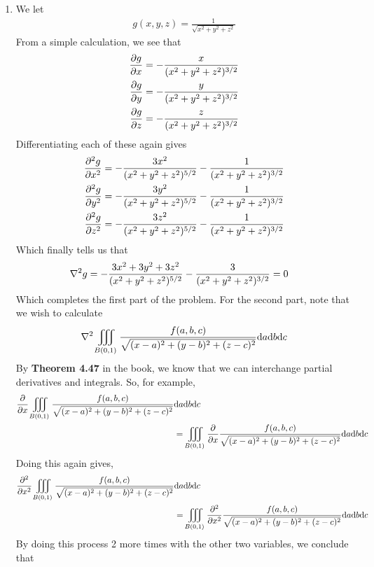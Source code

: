 \documentclass[12pt]{article}
\theoremstyle{definition}
\theoremstyle{remark}
\begin{document}
\begin{enumerate}[leftmargin=\labelsep]
		\item We let 
		\begin{align*}
			g(x,y,z)=\frac{1}{\sqrt{x^2+y^2+z^2}}
		\end{align*}
		From a simple calculation, we see that
		\begin{align*}
			\pdv{g}{x} = -\frac{x}{(x^2+y^2+z^2)^{3/2}} \\
			\pdv{g}{y} = -\frac{y}{(x^2+y^2+z^2)^{3/2}} \\
			\pdv{g}{z} = -\frac{z}{(x^2+y^2+z^2)^{3/2}}
		\end{align*}
		Differentiating each of these again gives
		\begin{align*}
			\pdv[2]{g}{x} = -\frac{3x^2}{(x^2+y^2+z^2)^{5/2}}-\frac1{(x^2+y^2+z^2)^{3/2}} \\
			\pdv[2]{g}{y} = -\frac{3y^2}{(x^2+y^2+z^2)^{5/2}}-\frac1{(x^2+y^2+z^2)^{3/2}} \\
			\pdv[2]{g}{z} = -\frac{3z^2}{(x^2+y^2+z^2)^{5/2}}-\frac1{(x^2+y^2+z^2)^{3/2}} \\
		\end{align*}
		Which finally tells us that
		\begin{align*}
			\laplacian{g}=-\frac{3x^2+3y^2+3z^2}{(x^2+y^2+z^2)^{5/2}}-\frac{3}{(x^2+y^2+z^2)^{3/2}} &= 0
		\end{align*}
		Which completes the first part of the problem. For the second part, note that we wish to calculate
		\begin{align*}
			\laplacian{\iiint_{B(0, 1)} \frac{f(a, b, c)}{\sqrt{(x-a)^2+(y-b)^2+(z-c)^2}}\dd a\dd b\dd c}
		\end{align*}
		By \textbf{Theorem 4.47} in the book, we know that we can interchange partial derivatives and integrals. So, for example,
		\begin{align*}
			\pdv{x} \iiint_{B(0, 1)} \frac{f(a, b, c)}{\sqrt{(x-a)^2+(y-b)^2+(z-c)^2}}&\dd a\dd b\dd c \\&= \iiint_{B(0, 1)} \pdv{x} \frac{f(a, b, c)}{\sqrt{(x-a)^2+(y-b)^2+(z-c)^2}}\dd a\dd b\dd c
		\end{align*}
		Doing this again gives,
		\begin{align*}
			\pdv[2]{x} \iiint_{B(0, 1)} \frac{f(a, b, c)}{\sqrt{(x-a)^2+(y-b)^2+(z-c)^2}}&\dd a\dd b\dd c \\&= \iiint_{B(0, 1)} \pdv[2]{x} \frac{f(a, b, c)}{\sqrt{(x-a)^2+(y-b)^2+(z-c)^2}}\dd a\dd b\dd c
		\end{align*}
		By doing this process 2 more times with the other two variables, we conclude that
		\begin{align*}

\end{align*}
\end{enumerate}
\end{document}
